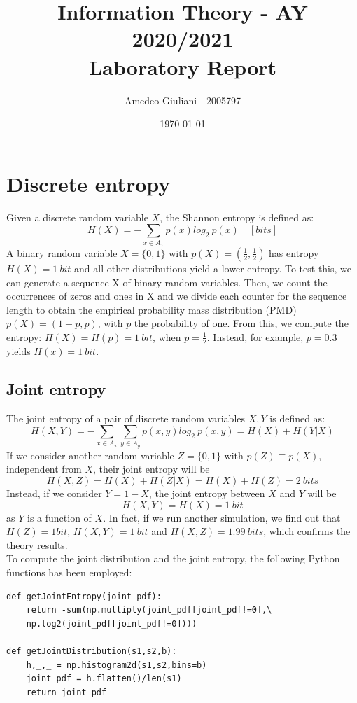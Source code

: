 \documentclass[a4paper]{article}
\begin{document}
	\title{Information Theory - AY 2020/2021\\Laboratory Report}
	\author{Amedeo Giuliani - 2005797}
	\date{\today}
	\maketitle
	
	\section{Discrete entropy}
	Given a discrete random variable $ X $, the Shannon entropy is defined as:
	\begin{equation}
		H(X) = -\sum_{x \in A_x} p(x)log_2\ p(x)\quad [bits]
	\end{equation}
	A binary random variable $ X=\{0,1\} $ with $ p(X) = \left(\frac{1}{2},\frac{1}{2}\right) $ has entropy $ H(X)=1\ bit$ and all other distributions yield a lower entropy. To test this, we can generate a sequence X of binary random variables. Then, we count the occurrences of zeros and ones in X and we divide each counter for the sequence length to obtain the empirical probability mass distribution (PMD) $ p(X)=(1-p,p) $, with $ p $ the probability of one. From this, we compute the entropy: $ H(X) = H(p) =1\ bit$, when $ p=\frac{1}{2} $. Instead, for example, $ p = 0.3 $ yields $ H(x)=1\ bit $.
	\subsection{Joint entropy}
	The joint entropy of a pair of discrete random variables $ X,Y $ is defined as:
	\begin{equation}
		H(X,Y) = -\sum_{x \in A_x}\sum_{y\in A_y} p(x,y)log_2\ p(x,y) = H(X)+H(Y|X)
	\end{equation}
	If we consider another random variable $ Z=\{0,1\} $ with $ p(Z)\equiv p(X) $, independent from $ X $, their joint entropy will be
	\begin{equation}
		H(X,Z) = H(X)+H(Z|X) = H(X)+H(Z) = 2\ bits
	\end{equation}
	Instead, if we consider $ Y=1-X $, the joint entropy between $ X $ and $ Y $ will be
	\begin{equation}
		H(X,Y) = H(X) = 1\ bit
	\end{equation}
	as $ Y $ is a function of $ X $. In fact, if we run another simulation, we find out that $ H(Z)=1 bit $, $ H(X,Y) = 1\ bit $ and $ H(X,Z) = 1.99\ bits $, which confirms the theory results.\\
	To compute the joint distribution and the joint entropy, the following Python functions has been employed:
	\begin{verbatim}
def getJointEntropy(joint_pdf):
	return -sum(np.multiply(joint_pdf[joint_pdf!=0],\
	np.log2(joint_pdf[joint_pdf!=0])))
		
def getJointDistribution(s1,s2,b):
	h,_,_ = np.histogram2d(s1,s2,bins=b)
	joint_pdf = h.flatten()/len(s1)
	return joint_pdf
	\end{verbatim}
\end{document}
